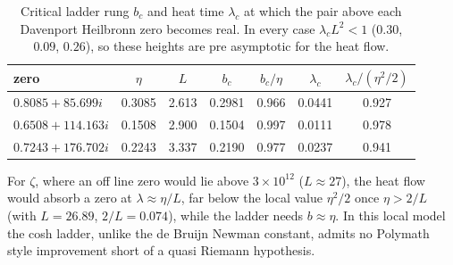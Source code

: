 \begin{table}[ht]
\centering
\footnotesize
\setlength{\tabcolsep}{3.5pt}
\begin{tabular}{lcccccc}
\toprule
zero & $\eta$ & $L$ & $b_c$ & $b_c/\eta$ & $\lambda_c$ & $\lambda_c/(\eta^2/2)$\\
\midrule
$0.8085+85.699i$ & 0.3085 & 2.613 & 0.2981 & 0.966 & 0.0441 & 0.927\\
$0.6508+114.163i$ & 0.1508 & 2.900 & 0.1504 & 0.997 & 0.0111 & 0.978\\
$0.7243+176.702i$ & 0.2243 & 3.337 & 0.2190 & 0.977 & 0.0237 & 0.941\\
\bottomrule
\end{tabular}
\caption{Critical ladder rung $b_c$ and heat time $\lambda_c$ at which the pair above each Davenport Heilbronn zero becomes real. In every case $\lambda_cL^2<1$ ($0.30$, $0.09$, $0.26$), so these heights are pre asymptotic for the heat flow.}
\label{mi:tab:thr}
\end{table}

For $\zeta$, where an off line zero would lie above $3\times10^{12}$ \cite{PT21} ($L\approx27$), the heat flow would absorb a zero at $\lambda\approx\eta/L$, far below the local value $\eta^2/2$ once $\eta>2/L$ (with $L=26.89$, $2/L=0.074$), while the ladder needs $b\approx\eta$. In this local model the cosh ladder, unlike the de Bruijn Newman constant, admits no Polymath style improvement short of a quasi Riemann hypothesis.

